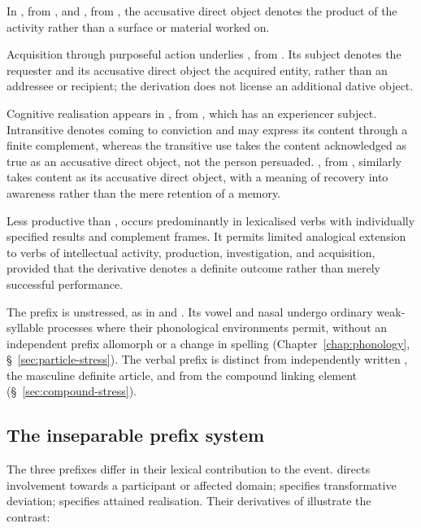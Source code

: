 In , from , and , from , the accusative direct object denotes the product of the activity rather than a surface or material worked on.

Acquisition through purposeful action underlies , from . Its subject denotes the requester and its accusative direct object the acquired entity, rather than an addressee or recipient; the derivation does not license an additional dative object.

Cognitive realisation appears in , from , which has an experiencer subject. Intransitive  denotes coming to conviction and may express its content through a finite  complement, whereas the transitive use takes the content acknowledged as true as an accusative direct object, not the person persuaded. , from , similarly takes content as its accusative direct object, with a meaning of recovery into awareness rather than the mere retention of a memory.

Less productive than ,  occurs predominantly in lexicalised verbs with individually specified results and complement frames. It permits limited analogical extension to verbs of intellectual activity, production, investigation, and acquisition, provided that the derivative denotes a definite outcome rather than merely successful performance.

The prefix is unstressed, as in  and . Its vowel and nasal undergo ordinary weak-syllable processes where their phonological environments permit, without an independent prefix allomorph or a change in spelling (Chapter~\ref{chap:phonology}, \S~\ref{sec:particle-stress}). The verbal prefix is distinct from independently written , the masculine definite article, and from the compound linking element  (\S~\ref{sec:compound-stress}).

\subsection{The inseparable prefix system}
\label{sec:inseparable-prefixes}

The three prefixes differ in their lexical contribution to the event.  directs involvement towards a participant or affected domain;  specifies transformative deviation;  specifies attained realisation. Their derivatives of  illustrate the contrast:

